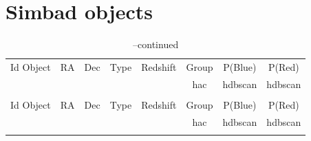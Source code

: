 \documentclass[fleqn,usenatbib]{mnras}
\begin{document}
\newcommand\TableHeader{
  \hline\hline
  Id Object & \(\mathrm{RA}\) & \(\mathrm{Dec}\) & Type & Redshift & Group & P(Blue) &  P(Red)\\
            &                 &                  &      &          &{\sc hac}& {\sc hdbscan}& {\sc hdbscan} \\
  \hline 
}

\section{Simbad objects}

\begin{center}
\onecolumn
\begin{longtable}{l r r c c c c c}
 \caption{Simbad sources. \label{tab:simbad}}\\
 \TableHeader\endfirsthead 
 \caption[]{--continued}\\
 \TableHeader\endhead
 \hline \endfoot
 
 \end{longtable} 
 \end{center}

\clearpage


\clearpage



\bsp	%
\label{lastpage}
\end{document}
